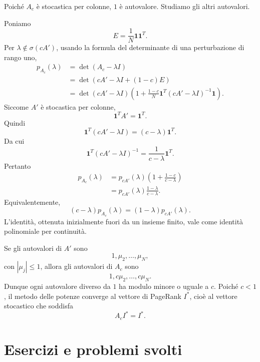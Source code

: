 \documentclass[a4paper]{article}
\begin{document}
\begin{snippetproof}{}
    Poiché \(A_c\) è stocastica per colonne, \(1\) è autovalore. Studiamo gli altri autovalori.

    Poniamo
    \[
        E=\frac1N\mathbf 1\mathbf 1^T.
    \]
    Per \(\lambda\notin \sigma(cA')\), usando la formula del determinante di una perturbazione di rango uno,
    \begin{align*}
        p_{A_c}(\lambda)
        &=\det(A_c-\lambda I)\\
        &=\det\left(cA'-\lambda I+(1-c)E\right)\\
        &=\det(cA'-\lambda I)
        \left(
            1+\frac{1-c}{N}\mathbf 1^T(cA'-\lambda I)^{-1}\mathbf 1
        \right).
    \end{align*}
    Siccome \(A'\) è stocastica per colonne,
    \[
        \mathbf 1^T A'=\mathbf 1^T.
    \]
    Quindi
    \[
        \mathbf 1^T(cA'-\lambda I)
        =(c-
        \lambda)\mathbf 1^T.
    \]
    Da cui
    \[
        \mathbf 1^T(cA'-\lambda I)^{-1}
        =\frac1{c-
        \lambda}\mathbf 1^T.
    \]
    Pertanto
    \begin{align*}
        p_{A_c}(\lambda)
        &=p_{cA'}(\lambda)
        \left(
            1+
            \frac{1-c}{c-
            \lambda}
        \right)\\
        &=p_{cA'}(\lambda)
        \frac{1-
        \lambda}{c-
        \lambda}.
    \end{align*}
    Equivalentemente,
    \[
        (c-
        \lambda)p_{A_c}(\lambda)
        =(1-
        \lambda)p_{cA'}(\lambda).
    \]
    L'identità, ottenuta inizialmente fuori da un insieme finito, vale come identità polinomiale per continuità.

    Se gli autovalori di \(A'\) sono
    \[
        1,\mu_2,
        \ldots,
        \mu_N,
    \]
    con \(|\mu_j|\leq 1\), allora gli autovalori di \(A_c\) sono
    \[
        1,c\mu_2,
        \ldots,c\mu_N.
    \]
    Dunque ogni autovalore diverso da \(1\) ha modulo minore o uguale a \(c\). Poiché \(c<1\), il metodo delle potenze converge al vettore di PageRank \(I^*\), cioè al vettore stocastico che soddisfa
    \[
        A_c I^*=I^*.
    \]
\end{snippetproof}

\pagebreak

\section{Esercizi e problemi svolti}
\end{document}
